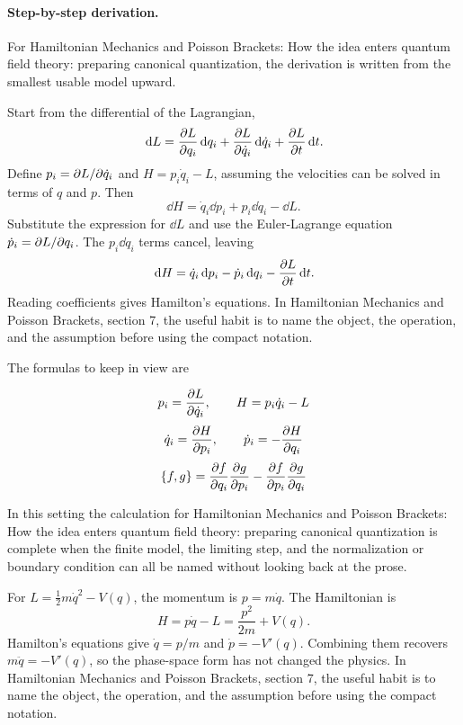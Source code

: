 \paragraph{Step-by-step derivation.}

For Hamiltonian Mechanics and Poisson Brackets: How the idea enters quantum field theory: preparing canonical quantization, the derivation is written from the smallest usable model upward.

Start from the differential of the Lagrangian,
\[
  \,\mathrm d L=\frac{\partial L}{\partial q_i}\,\mathrm d q_i+\frac{\partial L}{\partial\dot q_i}\,\mathrm d\dot q_i+\frac{\partial L}{\partial t}\,\mathrm d t.
\]
Define \(p_i=\partial L/\partial\dot q_i\) and \(H=p_i\dot q_i-L\), assuming the velocities can be solved in terms of \(q\) and \(p\).  Then
\[
  \dd H=\dot q_i\dd p_i+p_i\dd\dot q_i-\dd L.
\]
Substitute the expression for \(\dd L\) and use the Euler-Lagrange equation \(\dot p_i=\partial L/\partial q_i\).  The \(p_i\dd\dot q_i\) terms cancel, leaving
\[
  \,\mathrm d H=\dot q_i\,\mathrm d p_i-\dot p_i\,\mathrm d q_i-\frac{\partial L}{\partial t}\,\mathrm d t.
\]
Reading coefficients gives Hamilton's equations.  In Hamiltonian Mechanics and Poisson Brackets, section 7, the useful habit is to name the object, the operation, and the assumption before using the compact notation.

The formulas to keep in view are

\[
  p_i=\frac{\partial L}{\partial\dot q_i},\qquad H=p_i\dot q_i-L
\]
\[
  \dot q_i=\frac{\partial H}{\partial p_i},\qquad \dot p_i=-\frac{\partial H}{\partial q_i}
\]
\[
  \{f,g\}=\frac{\partial f}{\partial q_i}\frac{\partial g}{\partial p_i}-\frac{\partial f}{\partial p_i}\frac{\partial g}{\partial q_i}
\]

In this setting the calculation for Hamiltonian Mechanics and Poisson Brackets: How the idea enters quantum field theory: preparing canonical quantization is complete when the finite model, the limiting step, and the normalization or boundary condition can all be named without looking back at the prose.




\begin{example}
For \(L=\frac12m\dot q^2-V(q)\), the momentum is \(p=m\dot q\).  The Hamiltonian is
\[
  H=p\dot q-L=\frac{p^2}{2m}+V(q).
\]
Hamilton's equations give \(\dot q=p/m\) and \(\dot p=-V'(q)\).  Combining them recovers \(m\ddot q=-V'(q)\), so the phase-space form has not changed the physics.  In Hamiltonian Mechanics and Poisson Brackets, section 7, the useful habit is to name the object, the operation, and the assumption before using the compact notation.
\end{example}



